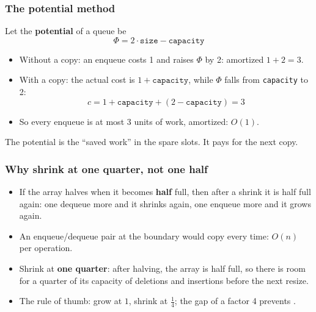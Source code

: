 \documentclass[aspectratio=169,10pt,compress]{beamer}
\begin{document}
\begin{frame}[t,fragile] \frametitle{The potential method}
  Let the \textbf{potential} of a queue be
  \[
  	\Phi = 2\cdot\texttt{size} - \texttt{capacity}
  \]
  \begin{itemize}\small
    \item Without a copy: an enqueue costs 1 and raises $\Phi$ by 2: amortized $1 + 2 = 3$.
    \item With a copy: the actual cost is $1 + \texttt{capacity}$, while
          $\Phi$ falls from \texttt{capacity} to 2:
          \[
          	\widehat{c} = 1 + \texttt{capacity} + (2 - \texttt{capacity}) = 3
          \]
    \item So every enqueue is at most 3 units of work, amortized: $O(1)$.
  \end{itemize}
  \vspace{0.2em}
  \small The potential is the ``saved work'' in the spare slots. It pays for the next copy.
\end{frame}




\begin{frame}[t,fragile] \frametitle{Why shrink at one quarter, not one half}
  \begin{itemize}\small
    \item If the array halves when it becomes \textbf{half} full, then after a shrink it is half full again:
          one dequeue more and it shrinks again, one enqueue more and it grows again.
    \item An enqueue/dequeue pair at the boundary would copy every time: $O(n)$ per operation.
    \item Shrink at \textbf{one quarter}: after halving, the array is half full, so there is room for
          a quarter of its capacity of deletions and insertions before the next resize.
    \item The rule of thumb: grow at $1$, shrink at $\frac{1}{4}$; the gap of a factor 4 prevents .
  \end{itemize}
\end{frame}

\end{document}
